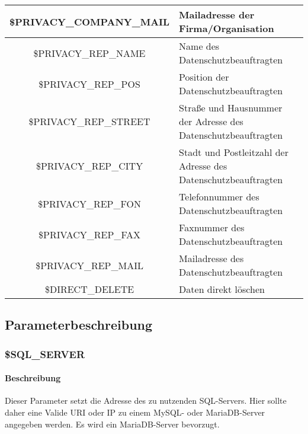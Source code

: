 \begin{longtable}[H]{|c|p{8cm}|}
	\$PRIVACY\_COMPANY\_MAIL   & Mailadresse der Firma/Organisation                                                                                                     \\ \hline	
	\$PRIVACY\_REP\_NAME      & Name des Datenschutzbeauftragten           																							\\ \hline
	\$PRIVACY\_REP\_POS       & Position der Datenschutzbeauftragten                                                                                          \\ \hline
	\$PRIVACY\_REP\_STREET    & Straße und Hausnummer der Adresse des Datenschutzbeauftragten                                                                                                     \\ \hline	
	\$PRIVACY\_REP\_CITY      & Stadt und Postleitzahl der Adresse des Datenschutzbeauftragten                                                                                                     \\ \hline	
	\$PRIVACY\_REP\_FON       & Telefonnummer des Datenschutzbeauftragten                                                                                                     \\ \hline	
	\$PRIVACY\_REP\_FAX       & Faxnummer des Datenschutzbeauftragten                                                                                                     \\ \hline	
	\$PRIVACY\_REP\_MAIL      & Mailadresse des Datenschutzbeauftragten                                                                                                     \\ \hline	
	\$DIRECT\_DELETE          & Daten direkt löschen                                                                                                     \\ \hline
\end{longtable}
\subsection{Parameterbeschreibung}
\subsubsection{\$SQL\_SERVER}
\paragraph{Beschreibung}Dieser Parameter setzt die Adresse des zu nutzenden SQL-Servers. Hier sollte daher eine Valide URI oder IP zu einem MySQL- oder MariaDB-Server angegeben werden. Es wird ein MariaDB-Server bevorzugt.
